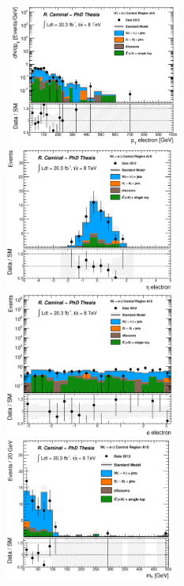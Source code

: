\begin{figure}[!ht]
  \begin{center}
    \mbox{
      \includegraphics[width=0.495\textwidth]{Appendix_FluctuationM6/Figures/plot_Stop_A10_CRele_e_pt_fitted.eps}
      \includegraphics[width=0.495\textwidth]{Appendix_FluctuationM6/Figures/plot_Stop_A10_CRele_e_eta_fitted.eps}
    }
    \mbox{
      \includegraphics[width=0.495\textwidth]{Appendix_FluctuationM6/Figures/plot_Stop_A10_CRele_e_phi_fitted.eps}
      \includegraphics[width=0.495\textwidth]{Appendix_FluctuationM6/Figures/plot_Stop_A10_CRele_e_MT_fitted.eps}
}
\end{center}
\end{figure}
